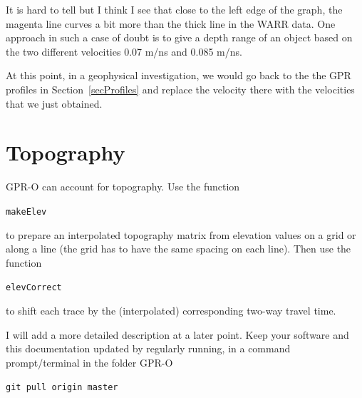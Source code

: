 \documentclass[11pt]{article}
\begin{document}
It is hard to tell but I think I see that close to the left edge of
the graph, the magenta line curves a bit more than the thick line in
the WARR data.  One approach in such a case of doubt is to give a
depth range of an object based on the two different velocities 0.07
m/ns and 0.085 m/ns.

At this point, in a geophysical investigation, we would go back to the
the GPR profiles in Section~\ref{secProfiles} and replace the velocity
there with the velocities that we just obtained.

\section{Topography}

GPR-O can account for topography. Use the function

\qquad \verb#makeElev#

to prepare an interpolated topography matrix from elevation values on
a grid or along a line (the grid has to have the same spacing on each
line). Then use the function

\qquad \verb#elevCorrect#

to shift each trace by the (interpolated) corresponding two-way travel
time.

I will add a more detailed description at a later point. Keep your
software and this documentation updated by regularly running, in a
command prompt/terminal in the folder GPR-O

\qquad \verb#git pull origin master#
\end{document}
